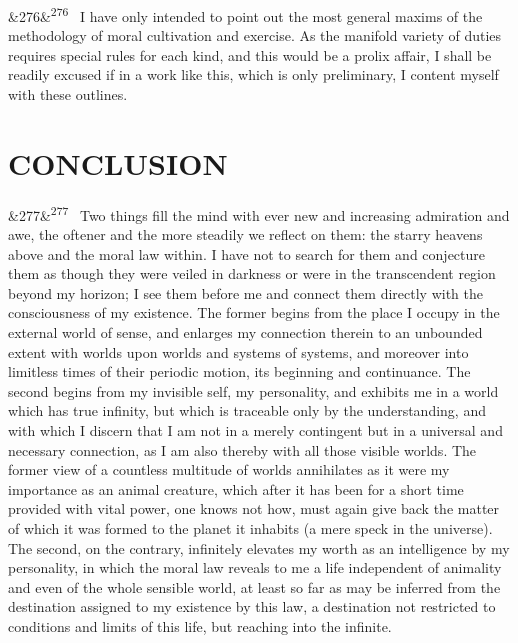 \documentclass[12pt]{article}
\newcommand{\para}[1][]{\par\noindent\ifx&#1&\else\textsuperscript{\footnotesize #1}~\fi}
\begin{document}
\para[276] I have only intended to point out the most general maxims of the methodology of moral cultivation and exercise. As the manifold variety of duties requires special rules for each kind, and this would be a prolix affair, I shall be readily excused if in a work like this, which is only preliminary, I content myself with these outlines.

\section*{CONCLUSION}

\para[277] Two things fill the mind with ever new and increasing admiration and awe, the oftener and the more steadily we reflect on them: the starry heavens above and the moral law within. I have not to search for them and conjecture them as though they were veiled in darkness or were in the transcendent region beyond my horizon; I see them before me and connect them directly with the consciousness of my existence. The former begins from the place I occupy in the external world of sense, and enlarges my connection therein to an unbounded extent with worlds upon worlds and systems of systems, and moreover into limitless times of their periodic motion, its beginning and continuance. The second begins from my invisible self, my personality, and exhibits me in a world which has true infinity, but which is traceable only by the understanding, and with which I discern that I am not in a merely contingent but in a universal and necessary connection, as I am also thereby with all those visible worlds. The former view of a countless multitude of worlds annihilates as it were my importance as an animal creature, which after it has been for a short time provided with vital power, one knows not how, must again give back the matter of which it was formed to the planet it inhabits (a mere speck in the universe). The second, on the contrary, infinitely elevates my worth as an intelligence by my personality, in which the moral law reveals to me a life independent of animality and even of the whole sensible world, at least so far as may be inferred from the destination assigned to my existence by this law, a destination not restricted to conditions and limits of this life, but reaching into the infinite.
\end{document}
